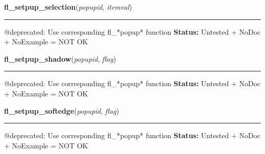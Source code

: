     \label{xformslib:deprecated:fl_setpup_selection}

    \vspace{0.5ex}

\hspace{.8\funcindent}\begin{boxedminipage}{\funcwidth}

    \raggedright \textbf{fl\_setpup\_selection}(\textit{popupid}, \textit{itemval})

    \vspace{-1.5ex}

    \rule{\textwidth}{0.5\fboxrule}
\setlength{\parskip}{2ex}

@deprecated: Use corresponding fl\_*popup* function
\setlength{\parskip}{1ex}
\textbf{Status:} 
Untested + NoDoc + NoExample = NOT OK


    \end{boxedminipage}

    \label{xformslib:deprecated:fl_setpup_shadow}

    \vspace{0.5ex}

\hspace{.8\funcindent}\begin{boxedminipage}{\funcwidth}

    \raggedright \textbf{fl\_setpup\_shadow}(\textit{popupid}, \textit{flag})

    \vspace{-1.5ex}

    \rule{\textwidth}{0.5\fboxrule}
\setlength{\parskip}{2ex}

@deprecated: Use corresponding fl\_*popup* function
\setlength{\parskip}{1ex}
\textbf{Status:} 
Untested + NoDoc + NoExample = NOT OK


    \end{boxedminipage}

    \label{xformslib:deprecated:fl_setpup_softedge}

    \vspace{0.5ex}

\hspace{.8\funcindent}\begin{boxedminipage}{\funcwidth}

    \raggedright \textbf{fl\_setpup\_softedge}(\textit{popupid}, \textit{flag})

    \vspace{-1.5ex}

    \rule{\textwidth}{0.5\fboxrule}
\setlength{\parskip}{2ex}

@deprecated: Use corresponding fl\_*popup* function
\setlength{\parskip}{1ex}
\textbf{Status:} 
Untested + NoDoc + NoExample = NOT OK


    \end{boxedminipage}

